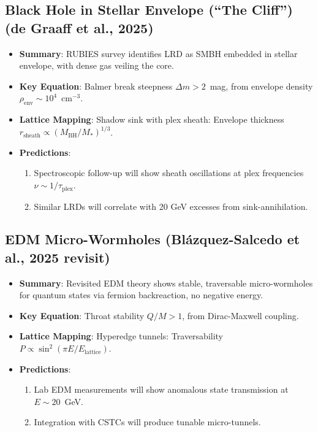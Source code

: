 \documentclass[11pt,a4paper]{article}
\begin{document}
\subsection{Black Hole in Stellar Envelope (``The Cliff'') (de Graaff et al., 2025)}

\begin{itemize}
\item \textbf{Summary}: RUBIES survey identifies LRD as SMBH embedded in stellar envelope, with dense gas veiling the core.

\item \textbf{Key Equation}: Balmer break steepness $\Delta m > 2$~mag, from envelope density $\rho_{\mathrm{env}} \sim 10^4$~cm$^{-3}$.

\item \textbf{Lattice Mapping}: Shadow sink with plex sheath: Envelope thickness $r_{\mathrm{sheath}} \propto (M_{\mathrm{BH}}/M_*)^{1/3}$.

\item \textbf{Predictions}:
\begin{enumerate}
\item Spectroscopic follow-up will show sheath oscillations at plex frequencies $\nu \sim 1/\tau_{\mathrm{plex}}$.
\item Similar LRDs will correlate with 20 GeV excesses from sink-annihilation.
\end{enumerate}
\end{itemize}

\subsection{EDM Micro-Wormholes (Bl\'azquez-Salcedo et al., 2025 revisit)}

\begin{itemize}
\item \textbf{Summary}: Revisited EDM theory shows stable, traversable micro-wormholes for quantum states via fermion backreaction, no negative energy.

\item \textbf{Key Equation}: Throat stability $Q/M >1$, from Dirac-Maxwell coupling.

\item \textbf{Lattice Mapping}: Hyperedge tunnels: Traversability $P \propto \sin^2(\pi E / E_{\mathrm{lattice}})$.

\item \textbf{Predictions}:
\begin{enumerate}
\item Lab EDM measurements will show anomalous state transmission at $E \sim 20$~GeV.
\item Integration with CSTCs will produce tunable micro-tunnels.
\end{enumerate}
\end{itemize}
\end{document}
